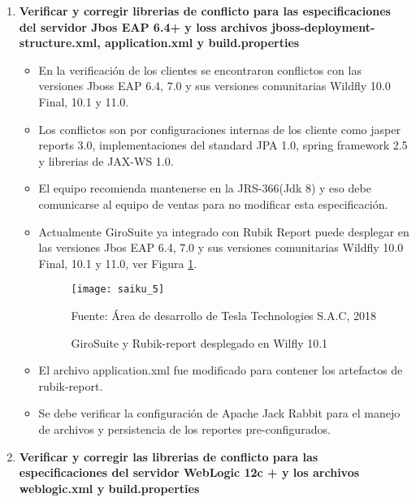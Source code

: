 \begin{spacing}{1.5}
\begin{enumerate}
			\item \textbf{Verificar y corregir librerias de conflicto para las especificaciones del servidor Jbos EAP 6.4+ y loss archivos jboss-deployment-structure.xml, application.xml y build.properties}
				\begin{itemize}
					\item En la verificaci\'{o}n de los clientes se encontraron conflictos con las versiones Jboss EAP 6.4, 7.0 y sus versiones comunitarias Wildfly 10.0 Final, 10.1 y 11.0.
					\item Los conflictos son por configuraciones internas de los cliente como jasper reports 3.0, implementaciones del standard JPA 1.0, spring framework 2.5 y librerias de JAX-WS 1.0.
					\item El equipo recomienda mantenerse en la JRS-366(Jdk 8) y eso debe comunicarse al equipo de ventas para no modificar esta especificaci\'{o}n.
					\item Actualmente GiroSuite ya integrado con Rubik Report puede desplegar en las versiones Jbos EAP 6.4, 7.0 y sus versiones comunitarias Wildfly 10.0 Final, 10.1 y 11.0, ver Figura \ref{figure:chaperIII_7}.
					\begin{figure}[H]
						\centering
						\texttt{[image: saiku\_5]}
						\caption {\centering \small{GiroSuite y Rubik-report desplegado en Wilfly 10.1}} \label{figure:chaperIII_7}
						\small {Fuente: \'{A}rea de desarrollo de Tesla Technologies S.A.C, 2018}
					\end{figure}
					
					\item El archivo application.xml fue modificado para contener los artefactos de rubik-report.
					\item Se debe verificar la configuraci\'{o}n de Apache Jack Rabbit para el manejo de archivos y persistencia de los reportes pre-configurados.
				\end{itemize}
			
			\item \textbf{Verificar y corregir las librerias de conflicto para las especificaciones del servidor WebLogic 12c + y los archivos weblogic.xml y build.properties}
		\end{enumerate}
		


\end{spacing}
